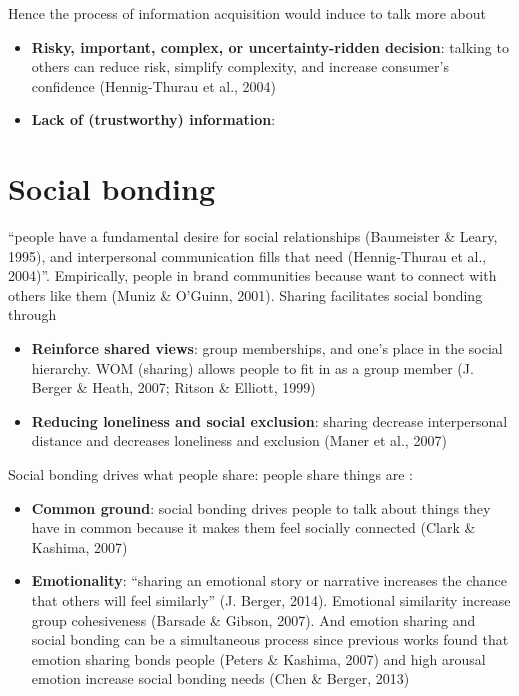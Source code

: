 \documentclass[
]{book}
\providecommand{\tightlist}{%
  \setlength{\itemsep}{0pt}\setlength{\parskip}{0pt}}
\begin{document}
Hence the process of information acquisition would induce to talk more about

\begin{itemize}
\tightlist
\item
  \textbf{Risky, important, complex, or uncertainty-ridden decision}: talking to others can reduce risk, simplify complexity, and increase consumer's confidence (Hennig-Thurau et al., 2004)\\
\item
  \textbf{Lack of (trustworthy) information}:
\end{itemize}

\hypertarget{social-bonding}{%
\section{Social bonding}\label{social-bonding}}

``people have a fundamental desire for social relationships (Baumeister \& Leary, 1995), and interpersonal communication fills that need (Hennig-Thurau et al., 2004)''. Empirically, people in brand communities because want to connect with others like them (Muniz \& O'Guinn, 2001). Sharing facilitates social bonding through

\begin{itemize}
\tightlist
\item
  \textbf{Reinforce shared views}: group memberships, and one's place in the social hierarchy. WOM (sharing) allows people to fit in as a group member (J. Berger \& Heath, 2007; Ritson \& Elliott, 1999)\\
\item
  \textbf{Reducing loneliness and social exclusion}: sharing decrease interpersonal distance and decreases loneliness and exclusion (Maner et al., 2007)
\end{itemize}

Social bonding drives what people share: people share things are :

\begin{itemize}
\tightlist
\item
  \textbf{Common ground}: social bonding drives people to talk about things they have in common because it makes them feel socially connected (Clark \& Kashima, 2007)
\item
  \textbf{Emotionality}: ``sharing an emotional story or narrative increases the chance that others will feel similarly'' (J. Berger, 2014). Emotional similarity increase group cohesiveness (Barsade \& Gibson, 2007). And emotion sharing and social bonding can be a simultaneous process since previous works found that emotion sharing bonds people (Peters \& Kashima, 2007) and high arousal emotion increase social bonding needs (Chen \& Berger, 2013)
\end{itemize}
\end{document}
